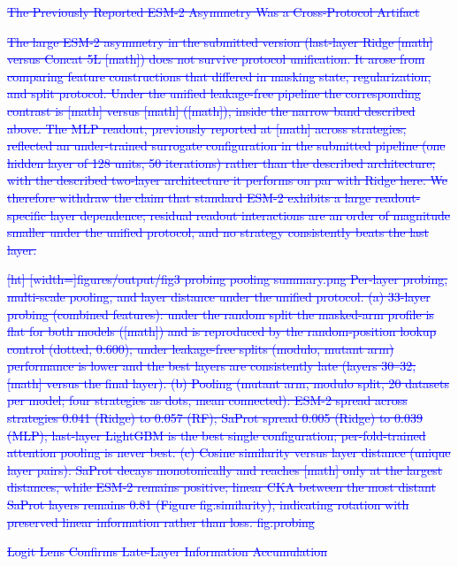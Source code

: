 \documentclass[11pt,a4paper]{article}
\begin{document}
\textcolor{blue}{\sout{The Previously Reported ESM-2 Asymmetry Was a Cross-Protocol Artifact}}

\textcolor{blue}{\sout{The large ESM-2 asymmetry in the submitted version (last-layer Ridge
[math] versus Concat 5L [math]) does not survive protocol
unification. It arose from comparing feature constructions that differed in masking
state, regularization, and split protocol. Under the unified leakage-free pipeline
the corresponding contrast is [math] versus [math] ([math]), inside the narrow
band described above. The MLP readout, previously reported at [math]
across strategies, reflected an under-trained surrogate configuration in the
submitted pipeline (one hidden layer of 128 units, 50 iterations) rather than the
described architecture; with the described two-layer architecture it performs on par
with Ridge here. We therefore withdraw the claim that standard ESM-2 exhibits a
large readout-specific layer dependence; residual readout interactions are an order
of magnitude smaller under the unified protocol, and no strategy consistently beats
the last layer.}}

\textcolor{blue}{\sout{[ht]
[width=]figures/output/fig3 probing pooling summary.png
Per-layer probing, multi-scale pooling, and layer distance under
the unified protocol.
(a) 33-layer probing (combined features): under the random split the
masked-arm profile is flat for both models ([math]) and is reproduced by
the random-position lookup control (dotted, 0.600); under leakage-free splits (modulo,
mutant arm) performance is lower and the best layers are consistently late (layers 30--32,
[math] versus the final layer).
(b) Pooling (mutant arm, modulo split, 20 datasets per model; four
strategies as dots, mean connected): ESM-2 spread across strategies 0.041 (Ridge) to 0.057
(RF); SaProt spread 0.005 (Ridge) to 0.039 (MLP); last-layer LightGBM is the best single
configuration; per-fold-trained attention pooling is never best.
(c) Cosine similarity versus layer distance (unique layer pairs):
SaProt decays monotonically and reaches [math] only at the largest distances, while
ESM-2 remains positive; linear CKA between the most distant SaProt layers remains 0.81
(Figure fig:similarity), indicating rotation with preserved linear information
rather than loss.
fig:probing}}

\textcolor{blue}{\sout{Logit Lens Confirms Late-Layer Information Accumulation}}
\end{document}

